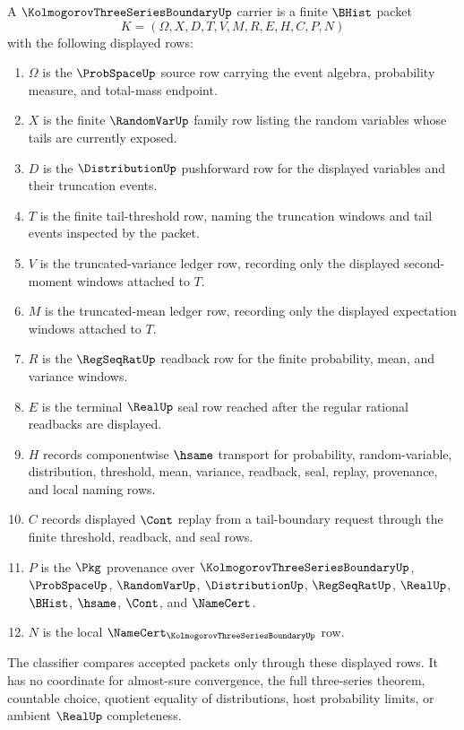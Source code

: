 \begin{definition}
\label{def:kolmogorov-three-series-boundary-carrier}
A $\KolmogorovThreeSeriesBoundaryUp$ carrier is a finite $\BHist$ packet
$$
K=(\Omega,X,D,T,V,M,R,E,H,C,P,N)
$$
with the following displayed rows:
\begin{enumerate}
\item $\Omega$ is the $\ProbSpaceUp$ source row carrying the event algebra, probability measure, and total-mass endpoint.
\item $X$ is the finite $\RandomVarUp$ family row listing the random variables whose tails are currently exposed.
\item $D$ is the $\DistributionUp$ pushforward row for the displayed variables and their truncation events.
\item $T$ is the finite tail-threshold row, naming the truncation windows and tail events inspected by the packet.
\item $V$ is the truncated-variance ledger row, recording only the displayed second-moment windows attached to $T$.
\item $M$ is the truncated-mean ledger row, recording only the displayed expectation windows attached to $T$.
\item $R$ is the $\RegSeqRatUp$ readback row for the finite probability, mean, and variance windows.
\item $E$ is the terminal $\RealUp$ seal row reached after the regular rational readbacks are displayed.
\item $H$ records componentwise $\hsame$ transport for probability, random-variable, distribution, threshold, mean, variance, readback, seal, replay, provenance, and local naming rows.
\item $C$ records displayed $\Cont$ replay from a tail-boundary request through the finite threshold, readback, and seal rows.
\item $P$ is the $\Pkg$ provenance over $\KolmogorovThreeSeriesBoundaryUp$, $\ProbSpaceUp$, $\RandomVarUp$, $\DistributionUp$, $\RegSeqRatUp$, $\RealUp$, $\BHist$, $\hsame$, $\Cont$, and $\NameCert$.
\item $N$ is the local $\NameCert_{\KolmogorovThreeSeriesBoundaryUp}$ row.
\end{enumerate}
The classifier compares accepted packets only through these displayed rows. It has no coordinate for almost-sure convergence, the full three-series theorem, countable choice, quotient equality of distributions, host probability limits, or ambient $\RealUp$ completeness.
\end{definition}

